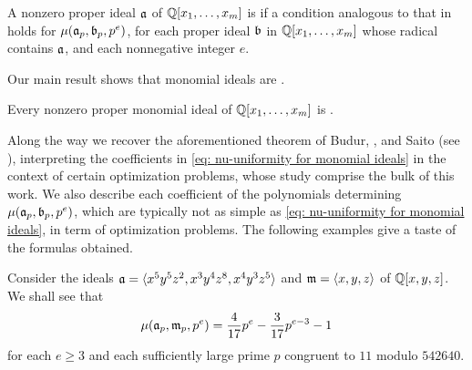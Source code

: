 \documentclass{article}
\begin{document}
\begin{definition}
   \label{defn: muCool}
   A nonzero proper ideal $\mathfrak{a}$ of $\mathbb{Q}[x_1,\ldots,x_m]$ is \emph{\muCool} if a condition analogous to that in 
   holds for $\mu(\mathfrak{a}_p,\mathfrak{b}_p,p^e)$, for each proper ideal $\mathfrak{b}$ in $\mathbb{Q}[x_1,\ldots,x_m]$ whose radical contains $\mathfrak{a}$, and each nonnegative integer $e$.
\end{definition}

Our main result shows that monomial ideals are \muCool.
\begin{thmintro}[\textcolor{nicered}{ADD CROSS-REFERENCE}]
   \label{main theorem}
   Every nonzero proper monomial ideal of $\mathbb{Q}[x_1,\ldots,x_m]$ is \muCool.
\end{thmintro}

Along the way we recover the aforementioned theorem of Budur, \mustata, and Saito (see ), interpreting the coefficients in \eqref{eq: nu-uniformity for monomial ideals} in the context of certain optimization problems, whose study comprise the bulk of this work. 
We also describe each coefficient of the polynomials determining $\mu(\mathfrak{a}_p,\mathfrak{b}_p,p^e)$, which are typically not as simple as \eqref{eq: nu-uniformity for monomial ideals}, in term of optimization problems.
The following examples give a taste of the formulas obtained.

\begin{example}
   \label{ex1 intro}
   Consider the ideals $\mathfrak{a} = \langle x^5 y^5 z^2, x^3 y^4 z^8, x^4 y^3 z^5 \rangle$ and $\mathfrak{m} = \langle x,y,z \rangle$ of $\mathbb{Q}[x,y,z]$.
   We shall see that
   \[
      \mu(\mathfrak{a}_p,\mathfrak{m}_p,p^e) = \frac{4}{17}p^e - \frac{3}{17}p^{e-3}  - 1
    \]
    for each $e\ge 3$ and each sufficiently large prime $p$ congruent to $11$ modulo $\num{542640}$.
\end{example}
\end{document}
